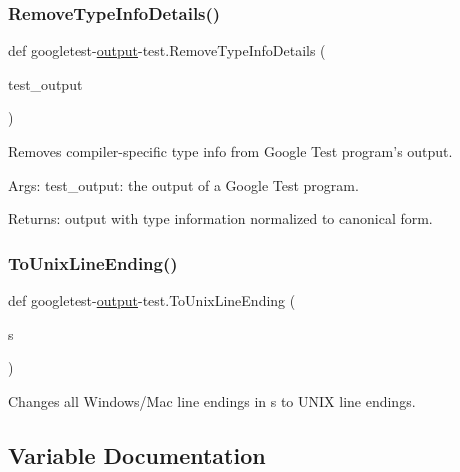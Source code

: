 \subsubsection{\texorpdfstring{RemoveTypeInfoDetails()}{RemoveTypeInfoDetails()}}
{\footnotesize\ttfamily def googletest-\/\mbox{\hyperlink{namespacegoogletest-output-test_ab3df9ce09186215a36c30454cf282417}{output}}-\/test.\+Remove\+Type\+Info\+Details (\begin{DoxyParamCaption}\item[{}]{test\+\_\+output }\end{DoxyParamCaption})}

\begin{DoxyVerb}Removes compiler-specific type info from Google Test program's output.

Args:
     test_output:  the output of a Google Test program.

Returns:
     output with type information normalized to canonical form.
\end{DoxyVerb}
 \mbox{\label{namespacegoogletest-output-test_a5def06b36cb618d010e54bc71b07c36e}} 
\subsubsection{\texorpdfstring{ToUnixLineEnding()}{ToUnixLineEnding()}}
{\footnotesize\ttfamily def googletest-\/\mbox{\hyperlink{namespacegoogletest-output-test_ab3df9ce09186215a36c30454cf282417}{output}}-\/test.\+To\+Unix\+Line\+Ending (\begin{DoxyParamCaption}\item[{}]{s }\end{DoxyParamCaption})}

\begin{DoxyVerb}Changes all Windows/Mac line endings in s to UNIX line endings.\end{DoxyVerb}
 

\subsection{Variable Documentation}
\mbox{\label{namespacegoogletest-output-test_a7f642ce6ab89839d2ea88a438ef6b1f3}} 
